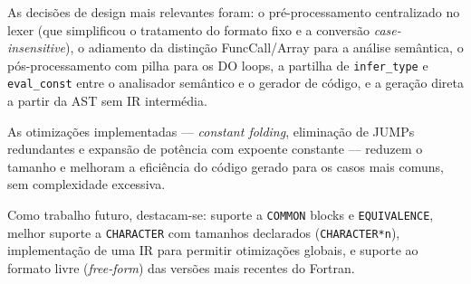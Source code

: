 \documentclass[a4paper]{article}
\begin{document}
\vspace{0.2cm}

\noindent As decisões de design mais relevantes foram: o pré-processamento centralizado no lexer (que simplificou o tratamento do formato fixo e a conversão \textit{case-insensitive}), o adiamento da distinção FuncCall/Array para a análise semântica, o pós-processamento com pilha para os DO loops, a partilha de \texttt{infer\_type} e \texttt{eval\_const} entre o analisador semântico e o gerador de código, e a geração direta a partir da AST sem IR intermédia.

\vspace{0.2cm}

\noindent As otimizações implementadas --- \textit{constant folding}, eliminação de JUMPs redundantes e expansão de potência com expoente constante --- reduzem o tamanho e melhoram a eficiência do código gerado para os casos mais comuns, sem complexidade excessiva.

\vspace{0.2cm}

\noindent Como trabalho futuro, destacam-se: suporte a \texttt{COMMON} blocks e \texttt{EQUIVALENCE}, melhor suporte a \texttt{CHARACTER} com tamanhos declarados (\texttt{CHARACTER*n}), implementação de uma IR para permitir otimizações globais, e suporte ao formato livre (\textit{free-form}) das versões mais recentes do Fortran.
\end{document}
